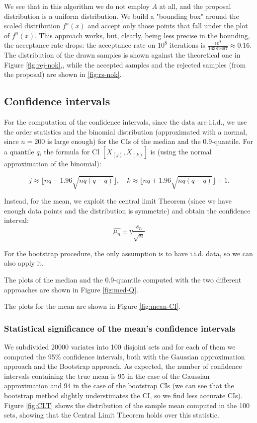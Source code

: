 \documentclass[a4paper,12pt]{article}
\begin{document}
We see that in this algorithm we do not employ $A$ at all, and the proposal distribution is a uniform distribution. We build a "bounding box" around the scaled distribution $f^n(x)$ and accept only those points that fall under the plot of $f^n(x)$. This approach works, but, clearly, being less precise in the bounding, the acceptance rate drops: the acceptance rate on $10^8$ iterations is $\frac{10^8}{16381697} \approx 0.16$. The distribution of the drawn samples is shown against the theoretical one in Figure \ref{fig:rej-nok},, while the accepted samples and the rejected samples (from the proposal) are shown in \ref{fig:rs-nok}.


\subsection{Confidence intervals}
For the computation of the confidence intervals, since the data are i.i.d., we use the order statistics and the binomial distribution (approximated with a normal, since $n=200$ is large enough) for the CIs of the median and the 0.9-quantile.
For a quantile $q$, the formula for CI $[X_{(j)},X_{(k)}]$ is (using the normal approximation of the binomial):

\begin{equation*}
    j \approx \lfloor nq-1.96\sqrt{nq(q-q)} \rfloor, \quad k \approx \lfloor nq+1.96\sqrt{nq(q-q)} \rfloor +1.
\end{equation*}

Instead, for the mean, we exploit the central limit Theorem (since we have enough data points and the distribution is symmetric) and obtain the confidence interval:
\begin{equation*}
    \hat{\mu_n} \pm \eta\frac{s_n}{\sqrt{n}}
\end{equation*}


For the bootstrap procedure, the only assumption is to have i.i.d. data, so we can also apply it.

The plots of the median and the 0.9-quantile computed with the two different approaches are shown in Figure \ref{fig:med-Q}.

The plots for the mean are shown in Figure \ref{fig:mean-CI}.

\subsubsection{Statistical significance of the mean's confidence intervals}

We subdivided 20000 variates into 100 disjoint sets and for each of them we computed the 95\% confidence intervals, both with the Gaussian approximation approach and the Bootstrap approach. As expected, the number of confidence intervals containing the true mean is 95 in the case of the Gaussian approximation and 94 in the case of the bootstrap CIs (we can see that the bootstrap method slightly understimates the CI, so we find less accurate CIs). Figure \ref{fig:CLT} shows the distribution of the sample mean computed in the 100 sets, showing that the Central Limit Theorem holds over this statistic.
\end{document}
